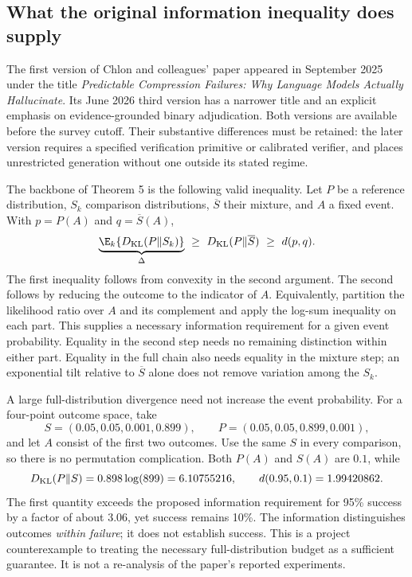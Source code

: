 \subsection{What the original information inequality does supply}

The first version of Chlon and colleagues' paper appeared in September 2025
under the title \emph{Predictable Compression Failures: Why Language Models
Actually Hallucinate}. Its June 2026 third version has a narrower title and
an explicit emphasis on evidence-grounded binary adjudication. Both versions
are available before the survey cutoff. Their substantive differences must
be retained: the later version requires a specified verification primitive
or calibrated verifier, and places unrestricted generation without one
outside its stated regime.
\citep{closure30chlonone,closure30chlonthree}

The backbone of Theorem 5 is the following valid inequality. Let $P$ be a
reference distribution, $S_k$ comparison distributions, $\overline S$ their
mixture, and $A$ a fixed event. With $p=P(A)$ and $q=\overline S(A)$,
\begin{equation}
 \underbrace{\E_k\{D_{\rm KL}(P\Vert S_k)\}}_{\Delta}
 \ \geq\ D_{\rm KL}(P\Vert\overline S)
 \ \geq\ d(p,q).
 \label{closure30:information-chain}
\end{equation}
The first inequality follows from convexity in the second argument. The
second follows by reducing the outcome to the indicator of $A$. Equivalently,
partition the likelihood ratio over $A$ and its complement and apply the
log-sum inequality on each part. This supplies a necessary information
requirement for a given event probability. Equality in the second step needs
no remaining distinction within either part. Equality in the full chain also
needs equality in the mixture step; an exponential tilt relative to
$\overline S$ alone does not remove variation among the $S_k$.
\citep[Theorem 5 and Appendix A.4]{closure30chlonone,closure30chlonthree}

A large full-distribution divergence need not increase the event probability.
For a four-point outcome space, take
\begin{equation}
 S=(0.05,0.05,0.001,0.899),\qquad
 P=(0.05,0.05,0.899,0.001),
 \label{closure30:irrelevant-information}
\end{equation}
and let $A$ consist of the first two outcomes. Use the same $S$ in every
comparison, so there is no permutation complication. Both $P(A)$ and $S(A)$
are $0.1$, while
\begin{equation}
 D_{\rm KL}(P\Vert S)=0.898\log(899)=6.10755216,
 \qquad d(0.95,0.1)=1.99420862.
 \label{closure30:budget-counterexample}
\end{equation}
The first quantity exceeds the proposed information requirement for 95\%
success by a factor of about 3.06, yet success remains 10\%. The information
distinguishes outcomes \emph{within failure}; it does not establish success.
This is a project counterexample to treating the necessary full-distribution
budget as a sufficient guarantee. It is not a re-analysis of the paper's
reported experiments.


